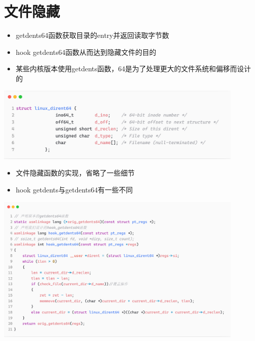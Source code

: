 \documentclass[11pt]{beamer}
\begin{document}
\section{文件隐藏}

\begin{frame}
	\begin{itemize}
		\item getdents64函数获取目录的entry并返回读取字节数
		\item hook getdents64函数从而达到隐藏文件的目的
		\item 某些内核版本使用getdents函数，64是为了处理更大的文件系统和偏移而设计的
	\end{itemize}
	\begin{itemize}
		\centering
		\includegraphics[width=0.90\textwidth]{pic/dirent64.png}
	\end{itemize}
\end{frame}

\begin{frame}
	\begin{itemize}
		\item 文件隐藏函数的实现，省略了一些细节
		\item hook getdents与getdents64有一些不同
	\end{itemize}
	\begin{itemize}
		\centering
		\includegraphics[width=0.90\textwidth]{pic/hook_getdents64.png}
	\end{itemize}
\end{frame}
\end{document}
